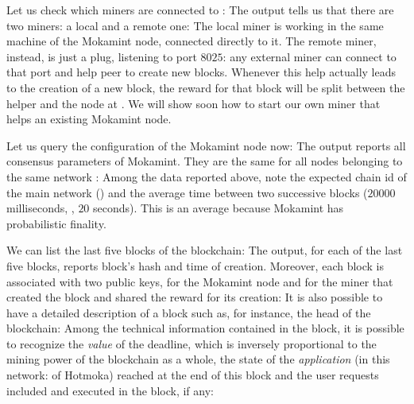 Let us check which miners are connected to \serverMokamintMainPublic{}:
%
%
The output tells us that there are two miners: a local and a remote one:
%
%
The local miner is working in the same machine of the Mokamint node, connected directly to it.
The remote miner, instead, is just a plug, listening to port $8025$: any external miner
can connect to that port and help peer \serverMokamintMainPublic{} to create new blocks.
Whenever this help actually leads to the creation of a new block, the reward for that block
will be split between the helper and the node at \serverMokamintMainPublic{}. We will show
soon how to start our own miner that helps an existing Mokamint node.

Let us query the configuration of the Mokamint node now:
%
%
The output reports all consensus parameters of Mokamint. They are the same for all nodes
belonging to the same network \texttt{\serverMokamintMainChainId{}}:
%
%
Among the data reported above, note the expected chain id of the main network
(\texttt{\serverMokamintMainChainId{}}) and the average time between two successive blocks
($20000$ milliseconds, \ie{}, $20$ seconds). This is an average because Mokamint
has probabilistic finality.

We can list the last five blocks of the blockchain:
%
%
The output, for each of the last five blocks, reports block's hash and time of creation.
Moreover, each block is associated with two public keys, for the Mokamint node and for the miner
that created the block and shared the reward for its creation:
%
%
It is also possible to have a detailed description of a block such as, for instance, the head of the
blockchain:
%
%
Among the technical information contained in the block, it is possible to recognize
the \emph{value} of the deadline, which is inversely proportional to the mining power
of the blockchain as a whole, the state of the \emph{application} (in this network: of Hotmoka)
reached at the end of this block and the user requests included and executed in the block, if any:
%

